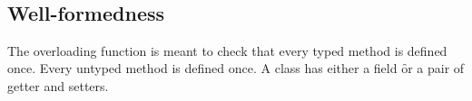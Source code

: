 \documentclass[a4paper,USenglish]{tex/lipics-v2016}
\begin{document}
~\\

\begin{mathpar}


\end{mathpar}

\begin{mathpar}


\end{mathpar}

\subsection{Well-formedness}

The overloading function is meant to check that every typed method is
defined once. Every untyped method is defined once. A class has either a
field \f or a pair of getter and setters. \\


\begin{mathpar}
\end{mathpar}


\begin{mathpar}
\end{mathpar}
\end{document}
